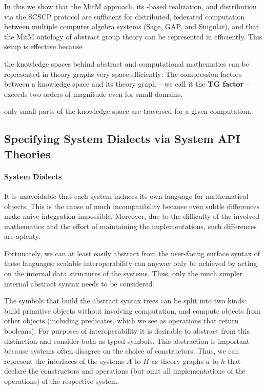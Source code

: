 In this \papertype we show that the MitM approach, its \ommt-based realization, and
distribution via the SCSCP protocol are sufficient for distributed, federated computation
between multiple computer algebra systems (Sage, GAP, and Singular), and that the MitM
ontology of abstract group theory can be represented in \ommt efficiently. This setup is
effective because
\begin{compactitem}
\item the knowledge spaces behind abstract and computational mathematics can be represented in theory graphs very space-efficiently: The compression factors between a knowledge space and its theory graph -- we call it the \textbf{TG factor} -- exceeds two orders of magnitude even for small domains.
\item only small parts of the knowledge space are traversed for a given computation. 
\end{compactitem}

\subsection{Specifying System Dialects via System API Theories}\label{sec:mitm:dialect}

\paragraph{System Dialects}
It is unavoidable that each system induces its own language for mathematical objects.
This is the cause of much incompatibility because even subtle differences make naive integration impossible.
Moreover, due to the difficulty of the involved mathematics and the effort of maintaining the implementations, such differences are aplenty.

Fortunately, we can at least easily abstract from the user-facing surface syntax of these languages:
scalable interoperability can anyway only be achieved by acting on the internal data structures of the systems.
Thus, only the much simpler internal abstract syntax needs to be considered.

The symbols that build the abstract syntax trees can be split into two kinds:  build primitive objects without involving computation, and 
compute objects from other objects (including predicates, which we see as operations that return booleans).
For purposes of interoperability it is desirable to abstract from this distinction and consider both as typed symbols.
This abstraction is important because systems often disagree on the choice of constructors.
Thus, we can represent the interfaces of the systems $A$ to $H$ as \OMMT theory graphs $a$ to $h$ that declare the constructors and operations (but omit all implementations of the operations) of the respective system.

